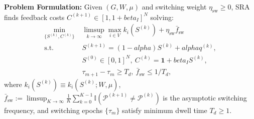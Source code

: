 \documentclass{ccjnl}
\newcommand{\rev}[1]{{\color{blue}#1}}
\def\rev#1{#1}%
\def\widetilde#1{#1}%
\def\kappa{k}%
\def\alpha{alpha}%
\def\beta{beta}%
\begin{document}
\rev{\textbf{Problem Formulation:} Given $(G, W, \mu)$ and switching weight $\eta_{\text{sw}} \ge 0$, SRA finds feedback costs $C^{(k+1)} \in [1, 1+\beta_I]^N$ solving:
\begin{equation}
    \label{eq:problem_formulation}
    \begin{aligned}
    \min_{\{S^{(k)}, C^{(k)}\}}\; & \limsup_{k \to \infty} \max_{i \in V} \widetilde{\kappa}_i(S^{(k)}) + \eta_{\text{sw}}\bar{f}_{\text{sw}} \\
    \text{s.t.}\; & S^{(k+1)} = (1-\alpha)S^{(k)} + \alpha q^{(k)}, \\
    & S^{(0)} \in [0,1]^N,\ C^{(k)} = \mathbf{1} + \beta_I S^{(k)}, \\
    & \tau_{m+1} - \tau_m \ge T_d,\ \bar{f}_{\text{sw}} \le 1/T_d,
    \end{aligned}
\end{equation}
where $\widetilde{\kappa}_i(S^{(k)}) \equiv \widetilde{\kappa}_i(S^{(k)}; W, \mu)$, $\bar{f}_{\text{sw}} := \limsup_{K\to\infty}\frac{1}{K}\sum_{k=0}^{K-1}\mathbb{I}(\mathcal{P}^{(k+1)}\neq\mathcal{P}^{(k)})$ is the asymptotic switching frequency, and switching epochs $\{\tau_m\}$ satisfy minimum dwell time $T_d \ge 1$.}
\end{document}
